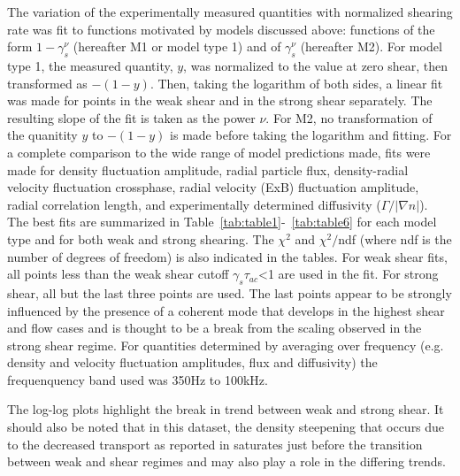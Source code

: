 \documentclass[aip,pop,amsmath,amssymb,preprint,superscriptaddress]{revtex4-1} %
\begin{document}
The variation of the experimentally measured quantities with normalized shearing rate  was fit to functions motivated by models discussed above: functions of the form $1-\gamma_{s}^{\nu}$ (hereafter M1 or model type 1) and of $\gamma_{s}^{\nu}$ (hereafter M2). For model type 1, the measured quantity, $y$, was normalized to the value at zero shear, then transformed as $-(1-y)$. Then, taking the logarithm of both sides, a linear fit was made for points in the weak shear and in the strong shear separately. The resulting slope of the fit is taken as the power $\nu$. For M2, no transformation of the quanitity $y$ to $-(1-y)$ is made before taking the logarithm and fitting. For a complete comparison to the wide range of model predictions made, fits were made for density fluctuation amplitude, radial particle flux, density-radial velocity fluctuation crossphase, radial velocity (ExB) fluctuation amplitude, radial correlation length, and experimentally determined diffusivity ($\Gamma/|\nabla n|$). The best fits are summarized in Table~\ref{tab:table1}-~\ref{tab:table6} for each model type and for both weak and strong shearing. The $\chi^{2}$ and $\chi^{2}/$ndf (where ndf is the number of degrees of freedom) is also indicated in the tables.  For weak shear fits, all points less than the weak shear cutoff $\gamma_{s}\tau_{ac}$<1 are used in the fit. For strong shear, all but the last three points are used. The last points appear to be strongly influenced by the presence of a coherent mode that develops in the highest shear and flow cases and is thought to be a break from the scaling observed in the strong shear regime. For quantities determined by averaging over frequency (e.g. density and velocity fluctuation amplitudes, flux and diffusivity) the frequenquency band used was 350Hz to 100kHz.

The log-log plots highlight the break in trend between weak and strong shear. It should also be noted that in this dataset, the density steepening that occurs due to the decreased transport as reported in \cite{schaffner11} saturates just before the transition between weak and shear regimes and may also play a role in the differing trends.
\end{document}
